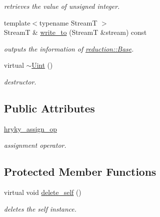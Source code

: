 \begin{DoxyCompactItemize}
\begin{DoxyCompactList}\small\item\em retrieves the value of unsigned integer. \end{DoxyCompactList}\item 
\hypertarget{classhryky_1_1reduction_1_1_base_a709cc7c48e1c90fe253739e46d82aa19}{{\footnotesize template$<$typename Stream\-T $>$ }\\Stream\-T \& \hyperlink{classhryky_1_1reduction_1_1_base_a709cc7c48e1c90fe253739e46d82aa19}{write\-\_\-to} (Stream\-T \&stream) const }\label{classhryky_1_1reduction_1_1_base_a709cc7c48e1c90fe253739e46d82aa19}

\begin{DoxyCompactList}\small\item\em outputs the information of \hyperlink{classhryky_1_1reduction_1_1_base}{reduction\-::\-Base}. \end{DoxyCompactList}\item 
\hypertarget{classhryky_1_1reduction_1_1_uint_a54dc08ec72eeae12bfe31b3a108ea98b}{virtual \hyperlink{classhryky_1_1reduction_1_1_uint_a54dc08ec72eeae12bfe31b3a108ea98b}{$\sim$\-Uint} ()}\label{classhryky_1_1reduction_1_1_uint_a54dc08ec72eeae12bfe31b3a108ea98b}

\begin{DoxyCompactList}\small\item\em destructor. \end{DoxyCompactList}\end{DoxyCompactItemize}
\subsection*{Public Attributes}
\begin{DoxyCompactItemize}
\item 
\hypertarget{classhryky_1_1reduction_1_1_uint_a0c1ecc3141df9331f2aedec389b36e68}{\hyperlink{classhryky_1_1reduction_1_1_uint_a0c1ecc3141df9331f2aedec389b36e68}{hryky\-\_\-assign\-\_\-op}}\label{classhryky_1_1reduction_1_1_uint_a0c1ecc3141df9331f2aedec389b36e68}

\begin{DoxyCompactList}\small\item\em assignment operator. \end{DoxyCompactList}\end{DoxyCompactItemize}
\subsection*{Protected Member Functions}
\begin{DoxyCompactItemize}
\item 
virtual void \hyperlink{classhryky_1_1reduction_1_1_base_a100265b04179500cd7901c8afea64eb0}{delete\-\_\-self} ()
\begin{DoxyCompactList}\small\item\em deletes the self instance. \end{DoxyCompactList}\end{DoxyCompactItemize}


